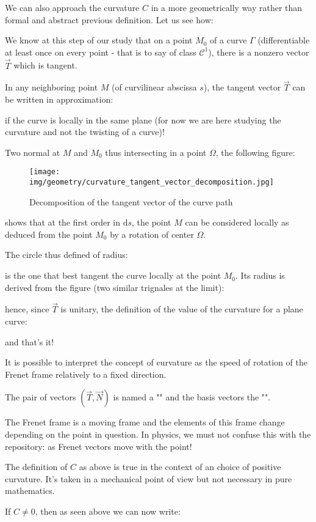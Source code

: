 {	We can also approach the curvature $C$ in a more geometrically way rather than formal and abstract previous definition. Let us see how:
	
	We know at this step of our study that on a point $M_0$ of a curve $\Gamma$ (differentiable at least once on every point - that is to say of class $\mathcal{C}^1$), there is a nonzero vector $\vec{T}$ which is tangent.
	
	In any neighboring point $M$ (of curvilinear abscissa $s$), the tangent vector $\vec{T}$ can be written in approximation:
	
	if the curve is locally in the same plane (for now we are here studying the curvature and not the twisting of a curve)!
	
	Two normal at $M$ and $M_0$ thus intersecting in a point $\Omega$, the following figure:
	\begin{figure}[H]
		\centering
		\texttt{[image: img/geometry/curvature\_tangent\_vector\_decomposition.jpg]}
		\caption{Decomposition of the tangent vector of the curve path}
	\end{figure}
	shows that at the first order in $\mathrm{d}s$, the point $M$ can be considered locally as deduced from the point $M_0$ by a rotation of center $\Omega$.
	
	The circle thus defined of radius:
	
	is the one that best tangent the curve locally at the point $M_0$. Its radius is derived from the figure (two similar trignales at the limit):
	
	hence, since $\vec{T}$ is unitary, the definition of the value of the curvature for a plane curve:
	
	and that's it!
	
	It is possible to interpret the concept of curvature as the speed of rotation of the Frenet frame relatively to a fixed direction.
	
	The pair of vectors $(\vec{T}, \vec{N})$ is named a "" and the basis vectors the "".
	
	The Frenet frame is a moving frame and the elements of this frame change depending on the point in question. In physics, we must not confuse this with the repository: as Frenet vectors move with the point!
	
	\begin{tcolorbox}[title=Remark,colframe=black,arc=10pt]
	The definition of $C$ as above is true in the context of an choice of positive curvature. It's taken in a mechanical point of view but not necessary in pure mathematics.
	\end{tcolorbox}	
	If $C\neq 0$, then as seen above we can now write:
	
}
